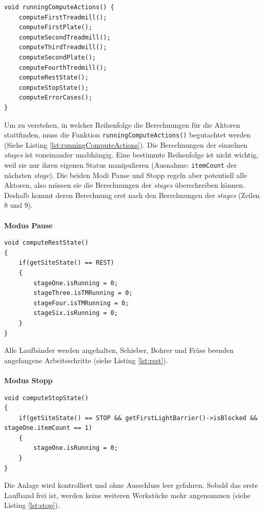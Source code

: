 \documentclass[fontsize=11pt,a4paper,final]{scrartcl}[2003/01/01]
\begin{document}
\begin{lstlisting}[caption={Die Funktion \lstinline|runningComputeActions|},label={lst:runningComputeActions}]
void runningComputeActions() {
	computeFirstTreadmill();
	computeFirstPlate();
	computeSecondTreadmill();
	computeThirdTreadmill();
	computeSecondPlate();
	computeFourthTredmill();
	computeRestState();
	computeStopState();
	computeErrorCases();
}
\end{lstlisting}
Um zu verstehen, in welcher Reihenfolge die Berechnungen für die Aktoren stattfinden, muss die Funktion \lstinline|runningComputeActions()| begutachtet werden (Siehe Listing \ref{lst:runningComputeActions}). Die Berechnungen der einzelnen \textit{stages} ist voneinander unabhängig. Eine bestimmte Reihenfolge ist nicht wichtig, weil sie nur ihren eigenen Status manipulieren (Ausnahme: \lstinline|itemCount| der nächsten \textit{stage}). Die beiden Modi Pause und Stopp regeln aber potentiell alle Aktoren, also müssen sie die Berechnungen der \textit{stages} überschreiben können. Deshalb kommt deren Berechnung erst nach den Berechnungen der \textit{stages} (Zeilen 8 und 9). \\ \\
\textbf{Modus Pause}
\begin{lstlisting}[caption={Die Pause Funktion},label={lst:rest}]
void computeRestState()
{
	if(getSiteState() == REST)
	{
		stageOne.isRunning = 0;
		stageThree.isTMRunning = 0;
		stageFour.isTMRunning = 0;
		stageSix.isRunning = 0;
	}
}
\end{lstlisting}
Alle Laufbänder werden angehalten, Schieber, Bohrer und Fräse beenden angefangene Arbeitsschritte (siehe Listing \ref{lst:rest}). \\ \\
\textbf{Modus Stopp}
\begin{lstlisting}[caption={Die Stopp Funktion},label={lst:stop}]
void computeStopState()
{
	if(getSiteState() == STOP && getFirstLightBarrier()->isBlocked && stageOne.itemCount == 1)
	{
		stageOne.isRunning = 0;
	}
}
\end{lstlisting}
Die Anlage wird kontrolliert und ohne Ausschluss leer gefahren. Sobald das erste Laufband frei ist, werden keine weiteren Werkstücke mehr angenommen (siehe Listing \ref{lst:stop}).
\end{document}
